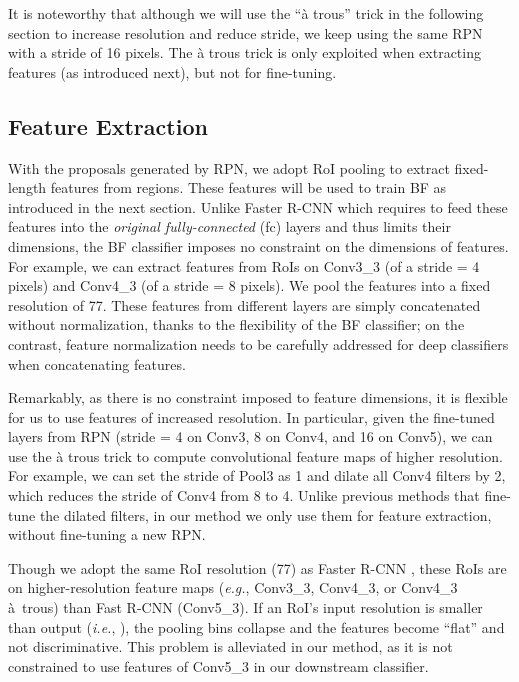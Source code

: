 \documentclass[runningheads]{llncs}
\def\eg{\emph{e.g.}}
\def\ie{\emph{i.e.}}
\begin{document}
It is noteworthy that although we will use the ``{\`a} trous'' \cite{chen2014semantic} trick in the following section to increase resolution and reduce stride, we keep using the same RPN with a stride of 16 pixels. The {\`a} trous trick is only exploited when extracting features (as introduced next), but not for fine-tuning.

\subsection{Feature Extraction}
\label{sec:feature}

With the proposals generated by RPN, we adopt RoI pooling \cite{girshickICCV15fastrcnn} to extract fixed-length features from regions. These features will be used to train BF as introduced in the next section. Unlike Faster R-CNN which requires to feed these features into the \emph{original fully-connected} (fc) layers and thus limits their dimensions, the BF classifier imposes no constraint on the dimensions of features. For example, we can extract features from RoIs on Conv3\_3 (of a stride = 4 pixels) and Conv4\_3 (of a stride = 8 pixels). We pool the features into a fixed resolution of 77. These features from different layers are simply concatenated without normalization, thanks to the flexibility of the BF classifier; on the contrast, feature normalization needs to be carefully addressed \cite{liu2015parsenet} for deep classifiers when concatenating features.

Remarkably, as there is no constraint imposed to feature dimensions, it is flexible for us to use features of increased resolution. In particular, given the fine-tuned layers from RPN (stride = 4 on Conv3,  8 on Conv4, and 16 on Conv5), we can use the {\`a} trous trick \cite{chen2014semantic} to compute convolutional feature maps of higher resolution. For example, we can set the stride of Pool3 as 1 and dilate all Conv4 filters by 2, which reduces the stride of Conv4 from 8 to 4. Unlike previous methods \cite{long2015fully,chen2014semantic} that fine-tune the dilated filters, in our method we only use them for feature extraction, without fine-tuning a new RPN. 

Though we adopt the same RoI resolution (77) as Faster R-CNN \cite{ren2015faster}, these RoIs are on higher-resolution feature maps (\eg, Conv3\_3, Conv4\_3, or Conv4\_3 {\`a}~trous) than Fast R-CNN (Conv5\_3). If an RoI's input resolution is smaller than output (\ie, ), the pooling bins collapse and the features become ``flat'' and not discriminative. This problem is alleviated in our method, as it is not constrained to use features of Conv5\_3 in our downstream classifier.
\end{document}
